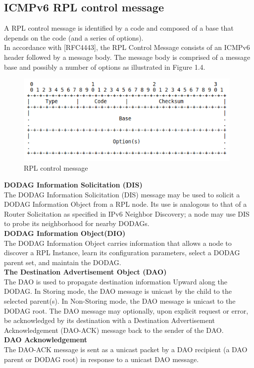 \subsection{ICMPv6 RPL control message} \label{ICMPv6 RPL Control message}
A RPL control message is identified by a code and composed of a base that depends on the code (and a series of options).\\
In accordance with [RFC4443], the RPL Control Message consists of an ICMPv6 header followed by a message body.  The message body is comprised of a message base and possibly a number of options as illustrated in Figure 1.4.\\
\begin{figure}[H]
\centering
\includegraphics[width=110mm]{RPL control message.png}
\caption{RPL control message}
\end{figure}
\noindent\textbf{DODAG Information Solicitation (DIS)}\\
The DODAG Information Solicitation (DIS) message may be used to solicit a DODAG Information Object from a RPL node.  Its use is analogous to that of a Router Solicitation as specified in IPv6 Neighbor Discovery; a node may use DIS to probe its neighborhood for nearby DODAGs.\\
\noindent\textbf{DODAG Information Object(DIO)}\\
The DODAG Information Object carries information that allows a node to discover a RPL Instance, learn its configuration parameters, select a DODAG parent set, and maintain the DODAG.\\
\noindent\textbf{The Destination Advertisement Object (DAO)}\\
The DAO is used to propagate destination information Upward along the DODAG.  In Storing mode, the DAO message is unicast by the child to the selected parent(s). In Non-Storing mode, the DAO message is unicast to the DODAG root. The DAO message may optionally, upon explicit request or error, be acknowledged by its destination with a Destination Advertisement Acknowledgement (DAO-ACK) message back to the sender of the DAO.\\
\noindent\textbf{DAO Acknowledgement}\\
The DAO-ACK message is sent as a unicast packet by a DAO recipient (a DAO parent or DODAG root) in response to a unicast DAO message.\\

\pagebreak